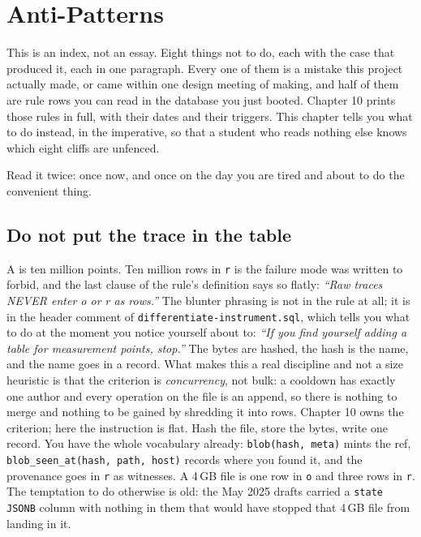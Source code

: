 \chapter{Anti-Patterns}

This is an index, not an essay. Eight things not to do, each with the case that produced it, each in one paragraph. Every one of them is a mistake this project actually made, or came within one design meeting of making, and half of them are rule rows you can read in the database you just booted. Chapter 10 prints those rules in full, with their dates and their triggers. This chapter tells you what to do instead, in the imperative, so that a student who reads nothing else knows which eight cliffs are unfenced.

Read it twice: once now, and once on the day you are tired and about to do the convenient thing.

\section{Do not put the trace in the table}

A \labColdSystemColloquial{} \labScan{} is ten million points. Ten million rows in \texttt{r} is the failure mode  was written to forbid, and the last clause of the rule's definition says so flatly: \textit{``Raw traces NEVER enter o or r as rows.''} The blunter phrasing is not in the rule at all; it is in the header comment of \texttt{differentiate-instrument.sql}, which tells you what to do at the moment you notice yourself about to: \textit{``If you find yourself adding a table for measurement points, stop.''} The bytes are hashed, the hash is the name, and the name goes in a record. What makes this a real discipline and not a size heuristic is that the criterion is \emph{concurrency}, not bulk: a \labColdSystemShort{} cooldown has exactly one author and every operation on the file is an append, so there is nothing to merge and nothing to be gained by shredding it into rows. Chapter 10 owns the criterion; here the instruction is flat. Hash the file, store the bytes, write one record. You have the whole vocabulary already: \texttt{blob(hash, meta)} mints the ref, \texttt{blob\_seen\_at(hash, path, host)} records where you found it, and the provenance goes in \texttt{r} as witnesses. A 4\,GB \labFileFormat{} file is one row in \texttt{o} and three rows in \texttt{r}. The temptation to do otherwise is old: the May 2025 drafts carried a \texttt{state JSONB} column with nothing in them that would have stopped that 4\,GB file from landing in it.

